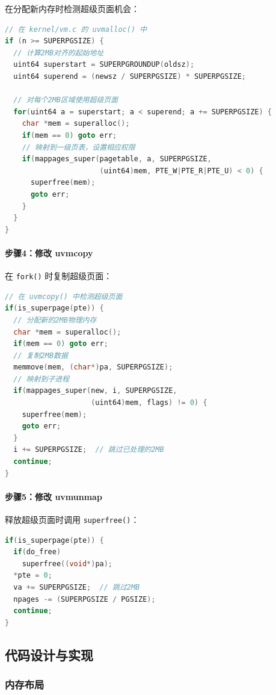 在分配新内存时检测超级页面机会：

\begin{lstlisting}[language=C]
// 在 kernel/vm.c 的 uvmalloc() 中
if (n >= SUPERPGSIZE) {
  // 计算2MB对齐的起始地址
  uint64 superstart = SUPERPGROUNDUP(oldsz);
  uint64 superend = (newsz / SUPERPGSIZE) * SUPERPGSIZE;
  
  // 对每个2MB区域使用超级页面
  for(uint64 a = superstart; a < superend; a += SUPERPGSIZE) {
    char *mem = superalloc();
    if(mem == 0) goto err;
    // 映射到一级页表，设置相应权限
    if(mappages_super(pagetable, a, SUPERPGSIZE, 
                      (uint64)mem, PTE_W|PTE_R|PTE_U) < 0) {
      superfree(mem);
      goto err;
    }
  }
}
\end{lstlisting}

\paragraph{步骤4：修改 uvmcopy}

在 \texttt{fork()} 时复制超级页面：

\begin{lstlisting}[language=C]
// 在 uvmcopy() 中检测超级页面
if(is_superpage(pte)) {
  // 分配新的2MB物理内存
  char *mem = superalloc();
  if(mem == 0) goto err;
  // 复制2MB数据
  memmove(mem, (char*)pa, SUPERPGSIZE);
  // 映射到子进程
  if(mappages_super(new, i, SUPERPGSIZE, 
                    (uint64)mem, flags) != 0) {
    superfree(mem);
    goto err;
  }
  i += SUPERPGSIZE;  // 跳过已处理的2MB
  continue;
}
\end{lstlisting}

\paragraph{步骤5：修改 uvmunmap}

释放超级页面时调用 \texttt{superfree()}：

\begin{lstlisting}[language=C]
if(is_superpage(pte)) {
  if(do_free)
    superfree((void*)pa);
  *pte = 0;
  va += SUPERPGSIZE;  // 跳过2MB
  npages -= (SUPERPGSIZE / PGSIZE);
  continue;
}
\end{lstlisting}

\subsection{代码设计与实现}

\subsubsection{内存布局}

